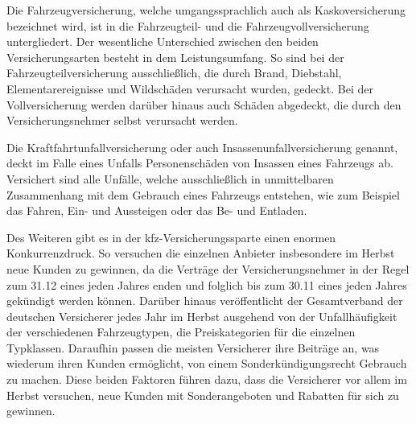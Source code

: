 Die Fahrzeugversicherung, welche umgangssprachlich auch als Kaskoversicherung bezeichnet wird, ist in die Fahrzeugteil- und die Fahrzeugvollversicherung untergliedert. Der wesentliche Unterschied zwischen den beiden Versicherungsarten besteht in dem Leistungsumfang. So sind bei der Fahrzeugteilversicherung ausschließlich, die durch Brand, Diebstahl, Elementarereignisse und Wildschäden verursacht wurden, gedeckt. Bei der Vollversicherung werden darüber hinaus auch Schäden abgedeckt, die durch den Versicherungsnehmer selbst verursacht werden.\autocite[Vgl.][S. 48]{FELTEN2012}

Die Kraftfahrtunfallversicherung oder auch Insassenunfallversicherung genannt, deckt im Falle eines Unfalls Personenschäden von Insassen eines Fahrzeugs ab. Versichert sind alle Unfälle, welche ausschließlich in unmittelbaren Zusammenhang mit dem Gebrauch eines Fahrzeugs entstehen, wie zum Beispiel das Fahren, Ein- und Aussteigen oder das Be- und Entladen.\autocite[Vgl.][S. 6f]{STADLER1998} 


Des Weiteren gibt es in der \ac{kfz}-Versicherungssparte einen enormen Konkurrenzdruck. So versuchen die einzelnen Anbieter insbesondere im Herbst neue Kunden zu gewinnen, da die Verträge der Versicherungsnehmer in der Regel zum 31.12 eines jeden Jahres enden und folglich bis zum 30.11 eines jeden Jahres gekündigt werden können.\autocite[Vgl.][]{WARENTEST2022} Darüber hinaus veröffentlicht der Gesamtverband der deutschen Versicherer jedes Jahr im Herbst ausgehend von der Unfallhäufigkeit der verschiedenen Fahrzeugtypen, die Preiskategorien für die einzelnen Typklassen. Daraufhin passen die meisten Versicherer ihre Beiträge an, was wiederum ihren Kunden ermöglicht, von einem Sonderkündigungsrecht Gebrauch zu machen.\autocite[Vgl.][]{NUS2022} Diese beiden Faktoren führen dazu, dass die Versicherer vor allem im Herbst versuchen, neue Kunden mit Sonderangeboten und Rabatten für sich zu gewinnen. 

